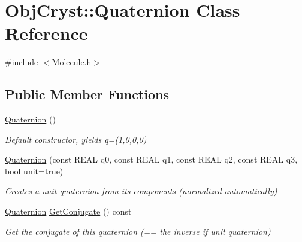 \hypertarget{class_obj_cryst_1_1_quaternion}{}\section{Obj\+Cryst\+::Quaternion Class Reference}
\label{class_obj_cryst_1_1_quaternion}


{\ttfamily \#include $<$Molecule.\+h$>$}

\subsection*{Public Member Functions}
\begin{DoxyCompactItemize}
\item 
\mbox{\label{class_obj_cryst_1_1_quaternion_af5260414dcf9aaeb479370b55542ad58}} 
\mbox{\hyperlink{class_obj_cryst_1_1_quaternion_af5260414dcf9aaeb479370b55542ad58}{Quaternion}} ()
\begin{DoxyCompactList}\small\item\em Default constructor, yields q=(1,0,0,0) \end{DoxyCompactList}\item 
\mbox{\label{class_obj_cryst_1_1_quaternion_a7adfabaa48d3f0a8aa056977f8a40492}} 
\mbox{\hyperlink{class_obj_cryst_1_1_quaternion_a7adfabaa48d3f0a8aa056977f8a40492}{Quaternion}} (const R\+E\+AL q0, const R\+E\+AL q1, const R\+E\+AL q2, const R\+E\+AL q3, bool unit=true)
\begin{DoxyCompactList}\small\item\em Creates a unit quaternion from its components (normalized automatically) \end{DoxyCompactList}\item 
\mbox{\label{class_obj_cryst_1_1_quaternion_a0d0d7b809d9447a70e2d91902ca0afcd}} 
\mbox{\hyperlink{class_obj_cryst_1_1_quaternion}{Quaternion}} \mbox{\hyperlink{class_obj_cryst_1_1_quaternion_a0d0d7b809d9447a70e2d91902ca0afcd}{Get\+Conjugate}} () const
\begin{DoxyCompactList}\small\item\em Get the conjugate of this quaternion (== the inverse if unit quaternion) \end{DoxyCompactList}\item 
\mbox{\label{class_obj_cryst_1_1_quaternion_a1180ded333fb5c84481bb0b92fbdcc03}} 

\end{DoxyCompactItemize}
